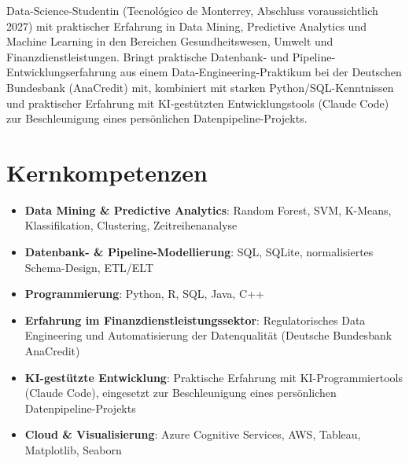 \documentclass[11pt,a4paper,sans]{moderncv}
\begin{document}
\makecvtitle


\vspace{6pt}
\small{Data-Science-Studentin (Tecnológico de Monterrey, Abschluss voraussichtlich 2027) mit praktischer Erfahrung in Data Mining, Predictive Analytics und Machine Learning in den Bereichen Gesundheitswesen, Umwelt und Finanzdienstleistungen. Bringt praktische Datenbank- und Pipeline-Entwicklungserfahrung aus einem Data-Engineering-Praktikum bei der Deutschen Bundesbank (AnaCredit) mit, kombiniert mit starken Python/SQL-Kenntnissen und praktischer Erfahrung mit KI-gestützten Entwicklungstools (Claude Code) zur Beschleunigung eines persönlichen Datenpipeline-Projekts.}


\section{Kernkompetenzen}
\vspace{1pt}
\begin{itemize}

\item \textbf{Data Mining \& Predictive Analytics}: Random Forest, SVM, K-Means, Klassifikation, Clustering, Zeitreihenanalyse

\item \textbf{Datenbank- \& Pipeline-Modellierung}: SQL, SQLite, normalisiertes Schema-Design, ETL/ELT

\item \textbf{Programmierung}: Python, R, SQL, Java, C++

\item \textbf{Erfahrung im Finanzdienstleistungssektor}: Regulatorisches Data Engineering und Automatisierung der Datenqualität (Deutsche Bundesbank AnaCredit)

\item \textbf{KI-gestützte Entwicklung}: Praktische Erfahrung mit KI-Programmiertools (Claude Code), eingesetzt zur Beschleunigung eines persönlichen Datenpipeline-Projekts

\item \textbf{Cloud \& Visualisierung}: Azure Cognitive Services, AWS, Tableau, Matplotlib, Seaborn

\end{itemize}
\end{document}
